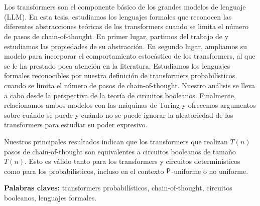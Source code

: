 \chapter*{\runtitulo}

\noindent 
Los transformers son el componente básico de los grandes modelos de lenguaje (LLM).
En esta tesis, estudiamos los lenguajes formales que reconocen las diferentes abstracciones teóricas de los transformers cuando se limita el número de pasos de chain-of-thought.
En primer lugar, partimos del trabajo de \citet{toyota} y estudiamos las propiedades de su abstracción.
En segundo lugar, ampliamos su modelo para incorporar el comportamiento estocástico de los transformers, al que se le ha prestado poca atención en la literatura.
Estudiamos los lenguajes formales reconocibles por nuestra definición de transformers probabilísticos cuando se limita el número de pasos de chain-of-thought.
Nuestro análisis se lleva a cabo desde la perspectiva de la teoría de circuitos booleanos.
Finalmente, relacionamos ambos modelos con las máquinas de Turing y ofrecemos argumentos sobre cuándo se puede y cuándo no se puede ignorar la aleatoriedad de los transformers para estudiar su poder expresivo.

Nuestros principales resultados indican que los transformers que realizan $T(n)$ pasos de chain-of-thought son equivalentes a circuitos booleanos de tamaño $T(n)$.
Esto es válido tanto para los transformers y circuitos determinísticos como para los probabilísticos, incluso en el contexto $\mathsf{P}$-uniforme o no uniforme.

\bigskip

\noindent\textbf{Palabras claves:} transformers probabilísticos, chain-of-thought, circuitos booleanos, lenguajes formales.

